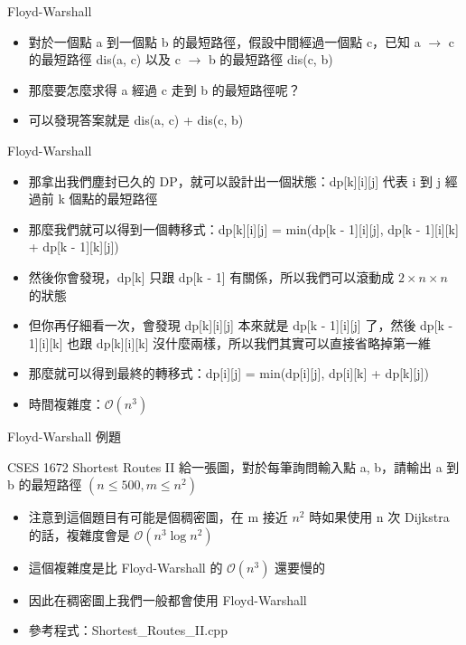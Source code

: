 \documentclass[aspectratio=169]{beamer}
\begin{document}
    \begin{frame}{Floyd-Warshall}
        \begin{itemize}
            \item<1-> 對於一個點 a 到一個點 b 的最短路徑，假設中間經過一個點 c，已知 a $\rightarrow$ c 的最短路徑 dis(a, c) 以及 c $\rightarrow$ b 的最短路徑 dis(c, b)
            \item<2-> 那麼要怎麼求得 a 經過 c 走到 b 的最短路徑呢？
            \item<3-> 可以發現答案就是 dis(a, c) + dis(c, b)
        \end{itemize}
    \end{frame}

    \begin{frame}{Floyd-Warshall}
        \begin{itemize}
            \item<1-> 那拿出我們塵封已久的 DP，就可以設計出一個狀態：dp[k][i][j] 代表 i 到 j 經過前 k 個點的最短路徑
            \item<2-> 那麼我們就可以得到一個轉移式：dp[k][i][j] = min(dp[k - 1][i][j], dp[k - 1][i][k] + dp[k - 1][k][j])
            \item<3-> 然後你會發現，dp[k] 只跟 dp[k - 1] 有關係，所以我們可以滾動成 $2 \times n \times n$ 的狀態
            \item<4-> 但你再仔細看一次，會發現 dp[k][i][j] 本來就是 dp[k - 1][i][j] 了，然後 dp[k - 1][i][k] 也跟 dp[k][i][k] 沒什麼兩樣，所以我們其實可以直接省略掉第一維
            \item<5-> 那麼就可以得到最終的轉移式：dp[i][j] = min(dp[i][j], dp[i][k] + dp[k][j])
            \item<5-> 時間複雜度：$\mathcal{O}(n^3)$
        \end{itemize}
    \end{frame}

    \begin{frame}{Floyd-Warshall 例題}
        \begin{block}{CSES 1672 Shortest Routes II}
            給一張圖，對於每筆詢問輸入點 a, b，請輸出 a 到 b 的最短路徑 $(n \le 500, m \le n^2)$
        \end{block}

        \begin{itemize}
            \item<2-> 注意到這個題目有可能是個稠密圖，在 m 接近 $n^2$ 時如果使用 n 次 Dijkstra 的話，複雜度會是 $\mathcal{O}(n^3 \log n^2)$
            \item<3-> 這個複雜度是比 Floyd-Warshall 的 $\mathcal{O}(n^3)$ 還要慢的
            \item<4-> 因此在稠密圖上我們一般都會使用 Floyd-Warshall
            \item<4-> 參考程式：Shortest\_Routes\_II.cpp
        \end{itemize}
    \end{frame}
\end{document}
